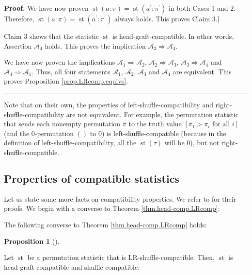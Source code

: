 \documentclass[numbers=enddot,12pt,final,onecolumn,notitlepage]{scrartcl}%
\theoremstyle{definition}
\newtheorem{prop}[theo]{Proposition}
\newenvironment{proposition}[1][]
{\begin{prop}[#1]\begin{leftbar}}
{\end{leftbar}\end{prop}}
\newenvironment{proof}[1][Proof]{\noindent\textbf{#1.} }{\ \rule{0.5em}{0.5em}}
\newenvironment{verlong}{}{}
\newenvironment{vershort}{}{}
\begin{document}
\begin{verlong}
\begin{proof}
We have now proven $\operatorname*{st}\left(  a:\pi\right)
=\operatorname*{st}\left(  a^{\prime}:\pi^{\prime}\right)  $ in both Cases 1
and 2. Therefore, $\operatorname*{st}\left(  a:\pi\right)  =\operatorname*{st}%
\left(  a^{\prime}:\pi^{\prime}\right)  $ always holds. This proves Claim 3.]

Claim 3 shows that the statistic $\operatorname*{st}$ is
head-graft-compatible. In other words, Assertion $\mathcal{A}_{4}$ holds. This
proves the implication $\mathcal{A}_{3}\Longrightarrow\mathcal{A}_{4}$.

We have now proven the implications $\mathcal{A}_{1}\Longrightarrow
\mathcal{A}_{2}$, $\mathcal{A}_{2}\Longrightarrow\mathcal{A}_{3}$,
$\mathcal{A}_{3}\Longrightarrow\mathcal{A}_{4}$ and $\mathcal{A}%
_{4}\Longrightarrow\mathcal{A}_{1}$. Thus, all four statements $\mathcal{A}%
_{1}$, $\mathcal{A}_{2}$, $\mathcal{A}_{3}$ and $\mathcal{A}_{4}$ are
equivalent. This proves Proposition \ref{prop.LRcomp.equivs}.
\end{proof}
\end{verlong}

Note that on their own, the properties of left-shuffle-compatibility and
right-shuffle-compatibility are not equivalent. For example, the permutation
statistic that sends each nonempty permutation $\pi$ to the truth value
$\left[  \pi_{1}>\pi_{i}\text{ for all }i\right]  $ (and the $0$-permutation
$\left(  {}\right)  $ to $0$) is left-shuffle-compatible (because in the
definition of left-shuffle-compatibility, all the $\operatorname*{st}\left(
\tau\right)  $ will be $0$), but not right-shuffle-compatible.

\subsection{Properties of compatible statistics}

\begin{vershort}
Let us state some more facts on compatibility properties. We refer to
\cite{verlong} for their proofs. We begin with a converse to Theorem
\ref{thm.head-comp.LRcomp}:
\end{vershort}

\begin{verlong}
The following converse to Theorem \ref{thm.head-comp.LRcomp} holds:
\end{verlong}

\begin{proposition}
\label{prop.LRcomp.head}Let $\operatorname*{st}$ be a permutation statistic
that is LR-shuffle-compatible. Then, $\operatorname*{st}$ is
head-graft-compatible and shuffle-compatible.
\end{proposition}
\end{document}
